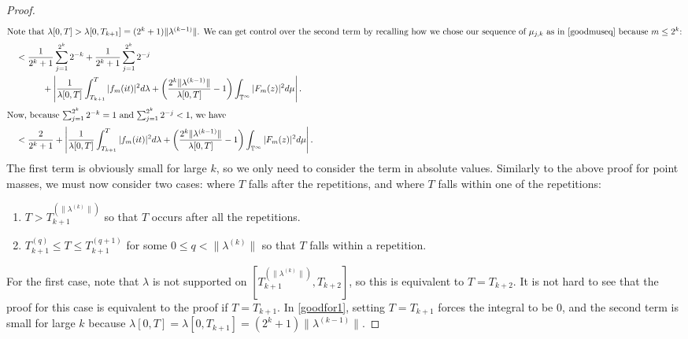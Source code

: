\documentclass[]{elsarticle}
\newcommand{\T}{\mathbb{T}}
\numberwithin{equation}{section}
\begin{document}
\begin{proof}
\begin{align}
        \intertext{Note that $\lambda[0,T] > \lambda[0,T_{k+1}] = (2^k+1)\|\lambda^{(k-1)}\|$. We can get control over the second term by recalling how we chose our sequence of $\mu_{j,k}$ as in \eqref{goodmuseq} because $m\leq 2^{k}$:}
          &\quad < \frac{1}{2^{k}+1}\sum_{j=1}^{2^{k}}2^{-k} + \frac{1}{2^{k}+1} \sum_{j=1}^{2^{k}}2^{-j} \nonumber\\ 
            &\qquad \qquad+ \left|\frac{1}{\lambda[0,T]} \int_{T_{k+1}}^{T} |f_m(it)|^2 d\lambda + \left(\frac{2^k\|\lambda^{(k-1)}\|}{\lambda[0,T]} -1\right)\int_{\T^{\infty}}|F_m(z)|^2d\mu\right|. \label{reduce1and3}\\
        \intertext{Now, because $\sum_{j=1}^{2^{k}}2^{-k}=1$ and $\sum_{j=1}^{2^{k}}2^{-j}<1$, we have}
          &\quad < \frac{2}{2^k+1} + \left|\frac{1}{\lambda[0,T]} \int_{T_{k+1}}^{T} |f_m(it)|^2 d\lambda + \left(\frac{2^k\|\lambda^{(k-1)}\|}{\lambda[0,T]} -1\right)\int_{\T^{\infty}}|F_m(z)|^2d\mu\right|. \label{goodfor1}
      \end{align}
      The first term is obviously small for large $k$, so we only need to consider the term in absolute values. Similarly to the above proof for point masses, we must now consider two cases: where $T$ falls after the repetitions, and where $T$ falls within one of the repetitions:
        \begin{enumerate}
          \item $T>T_{k+1}^{(\|\lambda^{(k)}\|)}$ so that $T$ occurs after all the repetitions. 
          \item $T_{k+1}^{(q)}\leq T \leq T_{k+1}^{(q+1)}$ for some $0\leq q < \|\lambda^{(k)}\| $ so that $T$ falls within a repetition.
        \end{enumerate}
      For the first case, note that $\lambda$ is not supported on $[T_{k+1}^{(\|\lambda^{(k)}\|)}, T_{k+2}] $, so this is equivalent to $T=T_{k+2}.$ It is not hard to see that the proof for this case is equivalent to the proof if $T=T_{k+1}$. In \ref{goodfor1}, setting $T=T_{k+1}$ forces the integral to be $0$, and the second term is small for large $k$ because $\lambda[0,T]=\lambda[0,T_{k+1}] = (2^k +1)\|\lambda^{(k-1)}\|$.


\end{proof}
\end{document}
